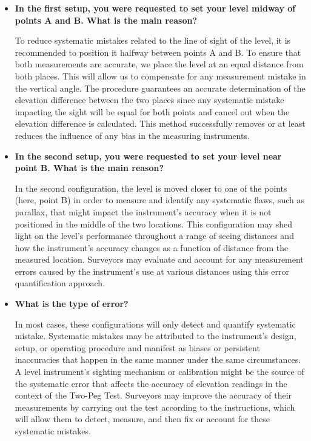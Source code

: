 \documentclass[12pt]{report}
\begin{document}
\begin{itemize}
\item  \textbf{In the first setup, you were requested to set your level midway of points A and B. What is the main reason?}
   
To reduce systematic mistakes related to the line of sight of the level, it is recommended to position it halfway between points A and B. To ensure that both measurements are accurate, we place the level at an equal distance from both places. This will allow us to compensate for any measurement mistake in the vertical angle. The procedure guarantees an accurate determination of the elevation difference between the two places since any systematic mistake impacting the sight will be equal for both points and cancel out when the elevation difference is calculated. This method successfully removes or at least reduces the influence of any bias in the measuring instruments.


\item \textbf{In the second setup, you were requested to set your level near point B. What is the main reason?}
   
In the second configuration, the level is moved closer to one of the points (here, point B) in order to measure and identify any systematic flaws, such as parallax, that might impact the instrument's accuracy when it is not positioned in the middle of the two locations. This configuration may shed light on the level's performance throughout a range of seeing distances and how the instrument's accuracy changes as a function of distance from the measured location. Surveyors may evaluate and account for any measurement errors caused by the instrument's use at various distances using this error quantification approach.


\item  \textbf{What is the type of error?}
   
In most cases, these configurations will only detect and quantify systematic mistake. Systematic mistakes may be attributed to the instrument's design, setup, or operating procedure and manifest as biases or persistent inaccuracies that happen in the same manner under the same circumstances. A level instrument's sighting mechanism or calibration might be the source of the systematic error that affects the accuracy of elevation readings in the context of the Two-Peg Test. Surveyors may improve the accuracy of their measurements by carrying out the test according to the instructions, which will allow them to detect, measure, and then fix or account for these systematic mistakes.

\end{itemize}
\end{document}
